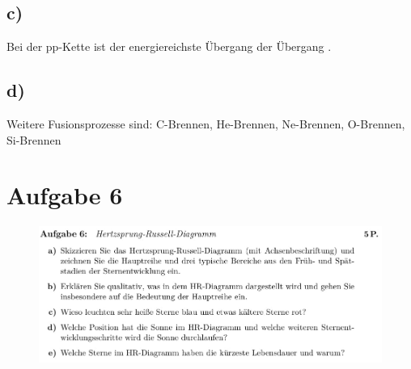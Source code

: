 \subsection{c)}
Bei der pp-Kette ist der energiereichste Übergang der Übergang .



\subsection{d)}

Weitere Fusionsprozesse sind:
C-Brennen, He-Brennen, Ne-Brennen, O-Brennen, Si-Brennen


\section{Aufgabe 6}

\begin{figure}[H]
    \centering
    \includegraphics[width=\textwidth]{images/Aufgabe6.jpg}
    \label{fig:3}
\end{figure}

